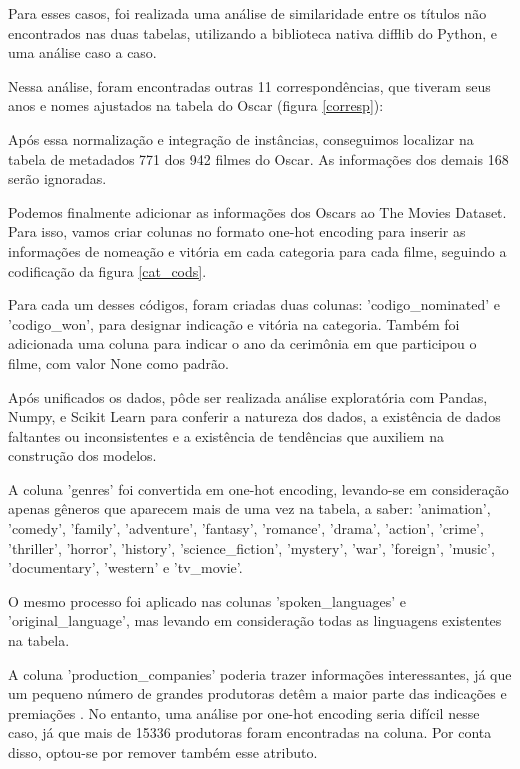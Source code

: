             Para esses casos, foi realizada uma análise de similaridade entre os títulos não encontrados nas duas tabelas, utilizando a biblioteca nativa difflib do Python, e uma análise caso a caso.

            Nessa análise, foram encontradas outras 11 correspondências, que tiveram seus anos e nomes ajustados na tabela do Oscar (figura \ref{corresp}):\newline

            Após essa normalização e integração de instâncias, conseguimos localizar na tabela de metadados 771 dos 942 filmes do Oscar. As informações dos demais 168 serão ignoradas.

            Podemos finalmente adicionar as informações dos Oscars ao The Movies Dataset. Para isso, vamos criar colunas no formato one-hot encoding para inserir as informações de nomeação e vitória em cada categoria para cada filme, seguindo a codificação da figura \ref{cat_cods}.

            Para cada um desses códigos, foram criadas duas colunas: '{codigo}\_nominated' e '{codigo}\_won', para designar indicação e vitória na categoria. Também foi adicionada uma coluna para indicar o ano da cerimônia em que participou o filme, com valor None como padrão.\newline

            Após unificados os dados, pôde ser realizada análise exploratória com Pandas, Numpy, e Scikit Learn para conferir a natureza dos dados, a existência de dados faltantes ou inconsistentes e a existência de tendências que auxiliem na construção dos modelos.\newline

            A coluna 'genres' foi convertida em one-hot encoding, levando-se em consideração apenas gêneros que aparecem mais de uma vez na tabela, a saber: 'animation', 'comedy', 'family', 'adventure', 'fantasy', 'romance', 'drama', 'action', 'crime', 'thriller', 'horror', 'history', 'science\_fiction', 'mystery', 'war', 'foreign', 'music', 'documentary', 'western' e 'tv\_movie'.

            O mesmo processo foi aplicado nas colunas 'spoken\_languages' e 'original\_language', mas levando em consideração todas as linguagens existentes na tabela.

            A coluna 'production\_companies' poderia trazer informações interessantes, já que um pequeno número de grandes produtoras detêm a maior parte das indicações e premiações \cite{argon2020}. No entanto, uma análise por one-hot encoding seria difícil nesse caso, já que mais de 15336 produtoras foram encontradas na coluna. Por conta disso, optou-se por remover também esse atributo.

